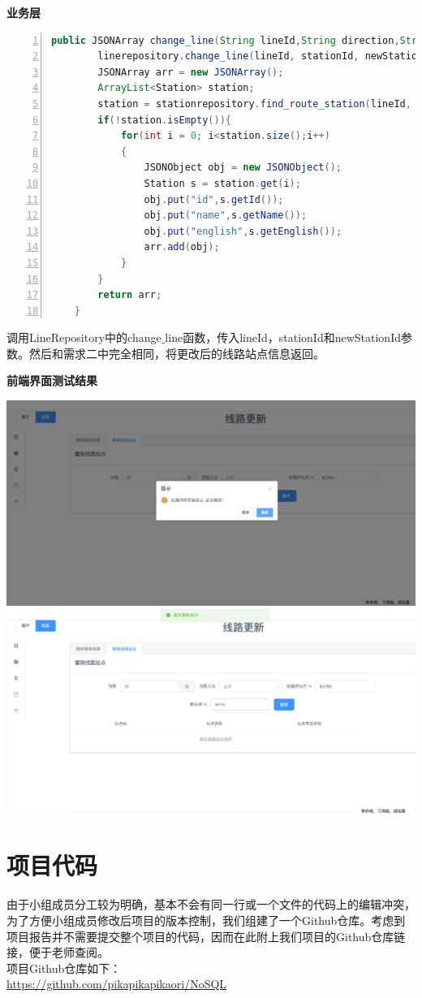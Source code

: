 \documentclass[11pt,a4paper]{article}
\begin{document}
\textbf{业务层} \\
\begin{lstlisting}[numbers = left, 
showstringspaces=false,
showspaces = false,
breaklines = true, 
language=Java]
    public JSONArray change_line(String lineId,String direction,String stationId,String newStationId){
        linerepository.change_line(lineId, stationId, newStationId);
        JSONArray arr = new JSONArray();
        ArrayList<Station> station;
        station = stationrepository.find_route_station(lineId, direction);
        if(!station.isEmpty()){
            for(int i = 0; i<station.size();i++)
            {
                JSONObject obj = new JSONObject();
                Station s = station.get(i);
                obj.put("id",s.getId());
                obj.put("name",s.getName());
                obj.put("english",s.getEnglish());
                arr.add(obj);
            }
        }
        return arr;
    }
\end{lstlisting} 
调用LineRepository中的change$\_$line函数，传入lineId，stationId和newStationId参数。然后和需求二中完全相同，将更改后的线路站点信息返回。

\textbf{前端界面测试结果} \\
\begin{center}
\centering
\includegraphics[scale=0.3]{./assets/demand20_3.png} \\ 
\includegraphics[scale=0.3]{./assets/demand20_4.png} 
\end{center}

\section{项目代码}
由于小组成员分工较为明确，基本不会有同一行或一个文件的代码上的编辑冲突，为了方便小组成员修改后项目的版本控制，我们组建了一个Github仓库。考虑到项目报告并不需要提交整个项目的代码，因而在此附上我们项目的Github仓库链接，便于老师查阅。 \\
项目Github仓库如下：\\
\url{https://github.com/pikapikapikaori/NoSQL}
\end{document}
